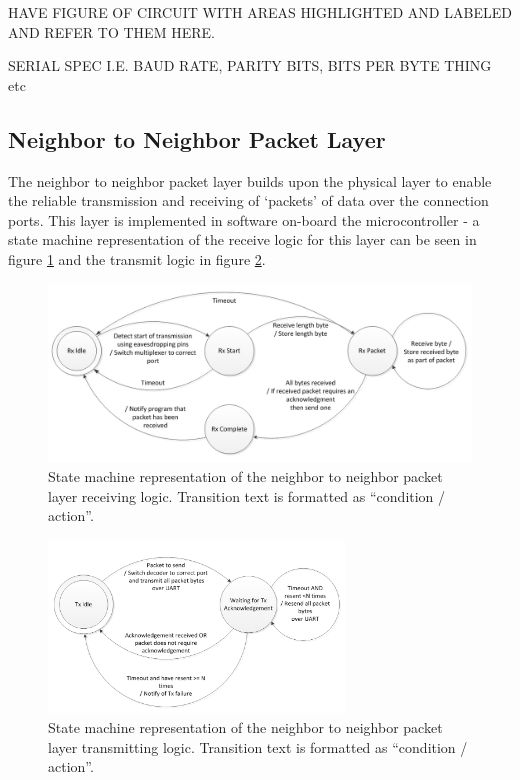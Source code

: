 HAVE FIGURE OF CIRCUIT WITH AREAS HIGHLIGHTED AND LABELED AND REFER TO THEM HERE.

SERIAL SPEC I.E. BAUD RATE, PARITY BITS, BITS PER BYTE THING etc

\subsection{Neighbor to Neighbor Packet Layer}

The neighbor to neighbor packet layer builds upon the physical layer to enable the reliable transmission and receiving of `packets' of data over the connection ports. This layer is implemented in software on-board the microcontroller - a state machine representation of the receive logic for this layer can be seen in figure \ref{fig:state-machine-packet-layer-rx} and the transmit logic in figure \ref{fig:state-machine-packet-layer-tx}.

\begin{figure}[h]
	\centering
	\includegraphics[width=1.0\textwidth]{Figures/state-machine-packet-layer-rx.png}
	\caption{State machine representation of the neighbor to neighbor packet layer receiving logic. Transition text is formatted as ``condition / action''.}
	\label{fig:state-machine-packet-layer-rx}    
\end{figure}

\begin{figure}[h]
	\centering
	\includegraphics[width=0.7\textwidth]{Figures/state-machine-packet-layer-tx.png}
	\caption{State machine representation of the neighbor to neighbor packet layer transmitting logic. Transition text is formatted as ``condition / action''.}
	\label{fig:state-machine-packet-layer-tx}    
\end{figure}